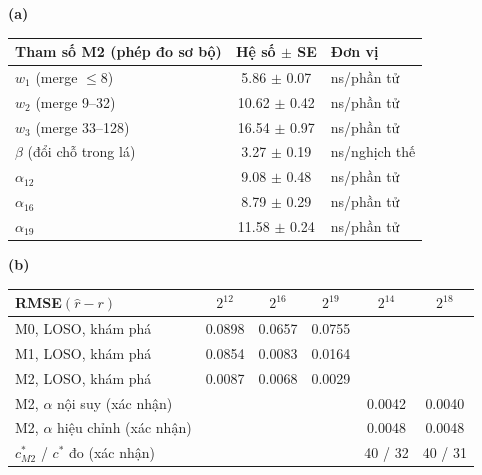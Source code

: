 \textbf{(a)}\par\smallskip
\begin{tabular}{lcl}
\toprule
Tham số M2 (phép đo sơ bộ) & Hệ số $\pm$ SE & Đơn vị \\
\midrule
$w_1$ (merge $\le 8$) & 5.86 $\pm$ 0.07 & ns/phần tử \\
$w_2$ (merge 9--32) & 10.62 $\pm$ 0.42 & ns/phần tử \\
$w_3$ (merge 33--128) & 16.54 $\pm$ 0.97 & ns/phần tử \\
$\beta$ (đổi chỗ trong lá) & 3.27 $\pm$ 0.19 & ns/nghịch thế \\
$\alpha_{12}$ & 9.08 $\pm$ 0.48 & ns/phần tử \\
$\alpha_{16}$ & 8.79 $\pm$ 0.29 & ns/phần tử \\
$\alpha_{19}$ & 11.58 $\pm$ 0.24 & ns/phần tử \\
\bottomrule
\end{tabular}
\bigskip

\textbf{(b)}\par\smallskip
\begin{tabular}{lccccc}
\toprule
RMSE$(\hat r - r)$ & $2^{12}$ & $2^{16}$ & $2^{19}$ & $2^{14}$ & $2^{18}$ \\
\midrule
M0, LOSO, khám phá & 0.0898 & 0.0657 & 0.0755 &  &  \\
M1, LOSO, khám phá & 0.0854 & 0.0083 & 0.0164 &  &  \\
M2, LOSO, khám phá & 0.0087 & 0.0068 & 0.0029 &  &  \\
\midrule
M2, $\alpha$ nội suy (xác nhận) &  &  &  & 0.0042 & 0.0040 \\
M2, $\alpha$ hiệu chỉnh (xác nhận) &  &  &  & 0.0048 & 0.0048 \\
$c^*_{M2}$ / $c^*$ đo (xác nhận) &  &  &  & 40 / 32 & 40 / 31 \\
\bottomrule
\end{tabular}
